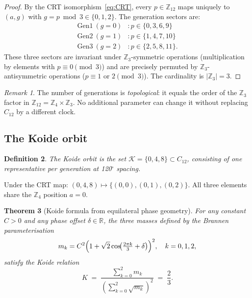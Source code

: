 \documentclass[11pt,a4paper]{article}
\newtheorem{theorem}{Theorem}
\newtheorem{definition}[theorem]{Definition}
\theoremstyle{remark}
\newtheorem{remark}[theorem]{Remark}
\begin{document}
\begin{proof}
  By the CRT isomorphism~\eqref{eq:CRT}, every $p \in \mathbb{Z}_{12}$ maps uniquely to
  $(a, g)$ with $g = p \bmod 3 \in \{0, 1, 2\}$.  The generation sectors are:
  \begin{align*}
    \text{Gen}1 \ (g=0) &: p \in \{0, 3, 6, 9\} \\
    \text{Gen}2 \ (g=1) &: p \in \{1, 4, 7, 10\} \\
    \text{Gen}3 \ (g=2) &: p \in \{2, 5, 8, 11\} .
  \end{align*}
  These three sectors are invariant under $\mathbb{Z}_3$-symmetric operations
  (multiplication by elements with $p \equiv 0 \pmod 3$) and are precisely permuted
  by $\mathbb{Z}_3$-antisymmetric operations ($p \equiv 1$ or $2 \pmod 3$).
  The cardinality is $|\mathbb{Z}_3| = 3$.
\end{proof}

\begin{remark}
  The number of generations is \emph{topological}: it equals the order of the $\mathbb{Z}_3$
  factor in $\mathbb{Z}_{12} = \mathbb{Z}_4 \times \mathbb{Z}_3$.  No additional
  parameter can change it without replacing $C_{12}$ by a different clock.
\end{remark}

\subsection{The Koide orbit}

\begin{definition}
  The \emph{Koide orbit} is the set $\mathcal{K} = \{0, 4, 8\} \subset C_{12}$,
  consisting of one representative per generation at 120$^\circ$ spacing.
\end{definition}

Under the CRT map: $(0,4,8) \mapsto \{(0,0),(0,1),(0,2)\}$.
All three elements share the $\mathbb{Z}_4$ position $a = 0$.

\begin{theorem}[Koide formula from equilateral phase geometry]
  For any constant $C > 0$ and any phase offset $\delta \in \mathbb{R}$, the three
  masses defined by the Brannen parameterisation
  \begin{equation}
    m_k = C^2 \Bigl(1 + \sqrt{2} \cos\!\bigl({\textstyle\frac{2\pi k}{3}} + \delta\bigr)\Bigr)^2,
    \quad k = 0, 1, 2 ,
  \label{eq:Brannen}
  \end{equation}
  satisfy the Koide relation
  \begin{equation}
    K \;=\; \frac{\sum_{k=0}^2 m_k}{\left(\sum_{k=0}^2 \sqrt{m_k}\right)^2}
          \;=\; \frac{2}{3} .
  \label{eq:Koide}
  \end{equation}
  \label{thm:Koide}
\end{theorem}
\end{document}
